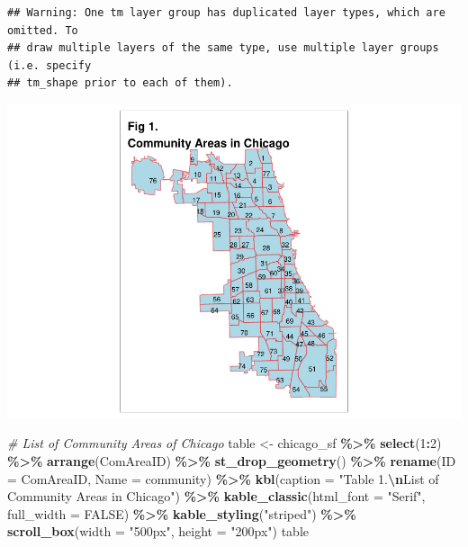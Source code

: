 \documentclass[
]{article}
\newenvironment{Shaded}{\begin{snugshade}}{\end{snugshade}}
\newcommand{\AttributeTok}[1]{\textcolor[rgb]{0.13,0.29,0.53}{#1}}
\newcommand{\CommentTok}[1]{\textcolor[rgb]{0.56,0.35,0.01}{\textit{#1}}}
\newcommand{\ConstantTok}[1]{\textcolor[rgb]{0.56,0.35,0.01}{#1}}
\newcommand{\DecValTok}[1]{\textcolor[rgb]{0.00,0.00,0.81}{#1}}
\newcommand{\FunctionTok}[1]{\textcolor[rgb]{0.13,0.29,0.53}{\textbf{#1}}}
\newcommand{\NormalTok}[1]{#1}
\newcommand{\OtherTok}[1]{\textcolor[rgb]{0.56,0.35,0.01}{#1}}
\newcommand{\SpecialCharTok}[1]{\textcolor[rgb]{0.81,0.36,0.00}{\textbf{#1}}}
\newcommand{\StringTok}[1]{\textcolor[rgb]{0.31,0.60,0.02}{#1}}
\begin{document}
\begin{verbatim}
## Warning: One tm layer group has duplicated layer types, which are omitted. To
## draw multiple layers of the same type, use multiple layer groups (i.e. specify
## tm_shape prior to each of them).
\end{verbatim}

\includegraphics[width=0.5\linewidth]{Sam-Song_Coding-Sample_files/figure-latex/unnamed-chunk-3-1}

\begin{Shaded}
\begin{Highlighting}[]
\CommentTok{\# List of Community Areas of Chicago}
\NormalTok{table }\OtherTok{\textless{}{-}}\NormalTok{ chicago\_sf }\SpecialCharTok{\%\textgreater{}\%}
  \FunctionTok{select}\NormalTok{(}\DecValTok{1}\SpecialCharTok{:}\DecValTok{2}\NormalTok{) }\SpecialCharTok{\%\textgreater{}\%}
  \FunctionTok{arrange}\NormalTok{(ComAreaID) }\SpecialCharTok{\%\textgreater{}\%}
  \FunctionTok{st\_drop\_geometry}\NormalTok{() }\SpecialCharTok{\%\textgreater{}\%}
  \FunctionTok{rename}\NormalTok{(}\AttributeTok{ID =}\NormalTok{ ComAreaID,}
         \AttributeTok{Name =}\NormalTok{ community) }\SpecialCharTok{\%\textgreater{}\%}
  \FunctionTok{kbl}\NormalTok{(}\AttributeTok{caption =} \StringTok{"Table 1.}\SpecialCharTok{\textbackslash{}n}\StringTok{List of Community Areas in Chicago"}\NormalTok{) }\SpecialCharTok{\%\textgreater{}\%}
  \FunctionTok{kable\_classic}\NormalTok{(}\AttributeTok{html\_font =} \StringTok{"Serif"}\NormalTok{,}
                \AttributeTok{full\_width =} \ConstantTok{FALSE}\NormalTok{) }\SpecialCharTok{\%\textgreater{}\%}
  \FunctionTok{kable\_styling}\NormalTok{(}\StringTok{"striped"}\NormalTok{) }\SpecialCharTok{\%\textgreater{}\%}
  \FunctionTok{scroll\_box}\NormalTok{(}\AttributeTok{width =} \StringTok{"500px"}\NormalTok{, }\AttributeTok{height =} \StringTok{"200px"}\NormalTok{)}
\NormalTok{table }
\end{Highlighting}
\end{Shaded}
\end{document}
